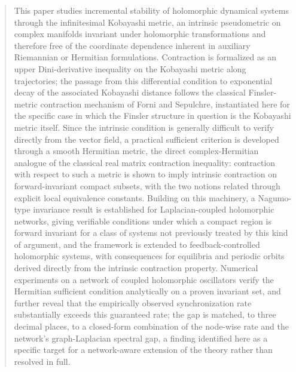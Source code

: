 \documentclass[preprint,12pt,authoryear]{elsarticle}
\begin{document}
\begin{frontmatter}
\begin{abstract}
This paper studies incremental stability of holomorphic dynamical systems
through the infinitesimal Kobayashi metric, an intrinsic pseudometric on
complex manifolds invariant under holomorphic transformations and therefore
free of the coordinate dependence inherent in auxiliary Riemannian or
Hermitian formulations. Contraction is formalized as an upper Dini-derivative
inequality on the Kobayashi metric along trajectories; the passage from this
differential condition to exponential decay of the associated Kobayashi
distance follows the classical Finsler-metric contraction mechanism of Forni
and Sepulchre, instantiated here for the specific case in which the Finsler
structure in question is the Kobayashi metric itself. Since the intrinsic
condition is generally difficult to verify directly from the vector field, a
practical sufficient criterion is developed through a smooth Hermitian
metric, the direct complex-Hermitian analogue of the classical real matrix
contraction inequality: contraction with respect to such a metric is shown
to imply intrinsic contraction on forward-invariant compact subsets, with
the two notions related through explicit local equivalence constants. Building
on this machinery, a Nagumo-type invariance result is established for
Laplacian-coupled holomorphic networks, giving verifiable conditions under
which a compact region is forward invariant for a class of systems not
previously treated by this kind of argument, and the framework is extended
to feedback-controlled holomorphic systems, with consequences for equilibria
and periodic orbits derived directly from the intrinsic contraction property.
Numerical experiments on a network of coupled holomorphic oscillators verify
the Hermitian sufficient condition analytically on a proven invariant set,
and further reveal that the empirically observed synchronization rate
substantially exceeds this guaranteed rate; the gap is matched, to three
decimal places, to a closed-form combination of the node-wise rate and the
network's graph-Laplacian spectral gap, a finding identified here as a
specific target for a network-aware extension of the theory rather than
resolved in full.
\end{abstract}


\end{frontmatter}
\end{document}
